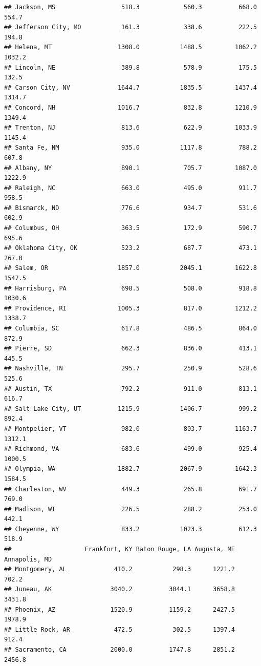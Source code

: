 \documentclass[
]{article}
\begin{document}
\begin{verbatim}
## Jackson, MS                  518.3            560.3          668.0      554.7
## Jefferson City, MO           161.3            338.6          222.5      194.8
## Helena, MT                  1308.0           1488.5         1062.2     1032.2
## Lincoln, NE                  389.8            578.9          175.5      132.5
## Carson City, NV             1644.7           1835.5         1437.4     1314.7
## Concord, NH                 1016.7            832.8         1210.9     1349.4
## Trenton, NJ                  813.6            622.9         1033.9     1145.4
## Santa Fe, NM                 935.0           1117.8          788.2      607.8
## Albany, NY                   890.1            705.7         1087.0     1222.9
## Raleigh, NC                  663.0            495.0          911.7      958.5
## Bismarck, ND                 776.6            934.7          531.6      602.9
## Columbus, OH                 363.5            172.9          590.7      695.6
## Oklahoma City, OK            523.2            687.7          473.1      267.0
## Salem, OR                   1857.0           2045.1         1622.8     1547.5
## Harrisburg, PA               698.5            508.0          918.8     1030.6
## Providence, RI              1005.3            817.0         1212.2     1338.7
## Columbia, SC                 617.8            486.5          864.0      872.9
## Pierre, SD                   662.3            836.0          413.1      445.5
## Nashville, TN                295.7            250.9          528.6      525.6
## Austin, TX                   792.2            911.0          813.1      616.7
## Salt Lake City, UT          1215.9           1406.7          999.2      892.4
## Montpelier, VT               982.0            803.7         1163.7     1312.1
## Richmond, VA                 683.6            499.0          925.4     1000.5
## Olympia, WA                 1882.7           2067.9         1642.3     1584.5
## Charleston, WV               449.3            265.8          691.7      769.0
## Madison, WI                  226.5            288.2          253.0      442.1
## Cheyenne, WY                 833.2           1023.3          612.3      518.9
##                    Frankfort, KY Baton Rouge, LA Augusta, ME Annapolis, MD
## Montgomery, AL             410.2           298.3      1221.2         702.2
## Juneau, AK                3040.2          3044.1      3658.8        3431.8
## Phoenix, AZ               1520.9          1159.2      2427.5        1978.9
## Little Rock, AR            472.5           302.5      1397.4         912.4
## Sacramento, CA            2000.0          1747.8      2851.2        2456.8

\end{verbatim}
\end{document}
